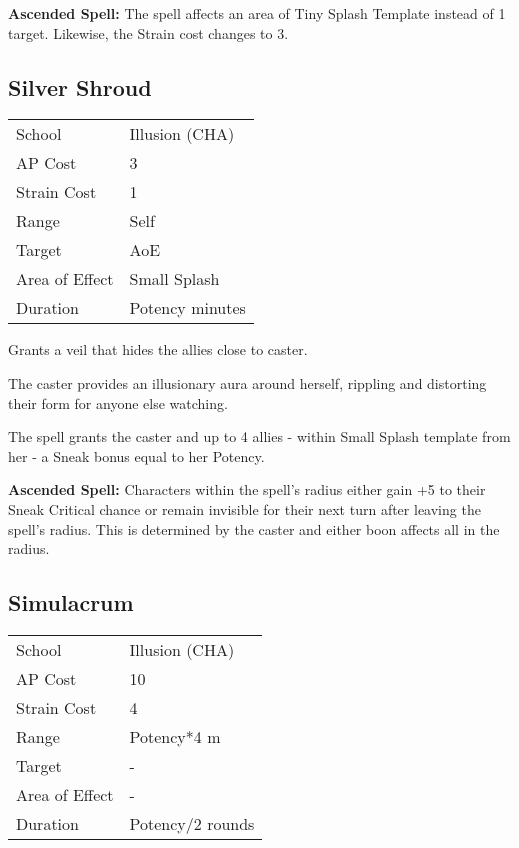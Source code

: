 \documentclass[11pt,a4paper,twocolumn]{book}
\begin{document}
\medskip

\textbf{Ascended Spell:} The spell affects an area of Tiny Splash Template instead of 1 target. Likewise, the Strain cost changes to 3.


\subsection*{Silver Shroud}
{
	\begin{tabu} to 75mm{| X[l,4] | X[l,7] |}
		\hline
		School 			& Illusion (CHA) 		\\
		AP Cost	      	& 3 					\\
		Strain Cost     & 1 					\\
		Range     		& Self					\\
		Target      	& AoE					\\
		Area of Effect  & Small Splash  	 		\\
		Duration     	& Potency minutes		\\ \hline
	\end{tabu}
	
}

\medskip

Grants a veil that hides the allies close to caster.

The caster provides an illusionary aura around herself, rippling and distorting their form for anyone else watching.

The spell grants the caster and up to 4 allies - within Small Splash template from her - a Sneak bonus equal to her Potency.

\textbf{Ascended Spell:} Characters within the spell's radius either gain +5 to their Sneak Critical chance or remain invisible for their next turn after leaving the spell's radius. This is determined by the caster and either boon affects all in the radius.


\subsection*{Simulacrum}
{
	\begin{tabu} to 75mm{| X[l,4] | X[l,7] |}
		\hline
		School 			& Illusion (CHA) 				\\
		AP Cost	      	& 10  				        	\\
		Strain Cost     & 4			                	\\
		Range     		& Potency*4 m					\\
		Target      	& -		                    	\\
		Area of Effect  & - 	 				\\
		Duration     	& Potency/2 rounds		\\ \hline
	\end{tabu}
	
}
\end{document}
